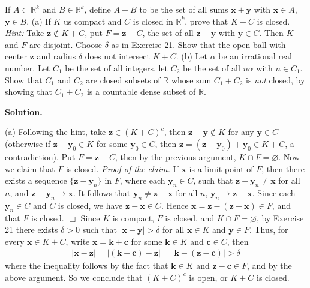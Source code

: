 \documentclass[12pt]{article}
\theoremstyle{definition}
\begin{document}
If $A\subset \mathbb{R}^k$ and $B\in \mathbb{R}^k$, define $A+B$ to be the set of all sums $\mathbf{x}+\mathbf{y}$ with $\mathbf{x}\in A$, $\mathbf{y}\in B$.
(a) If $K$ us compact and $C$ is closed in $\mathbb{R}^k$, prove that $K+C$ is closed.
\textit{Hint:} Take $\mathbf{z}\notin K+C$, put $F=\mathbf{z}-C$, the set of all $\mathbf{z}-\mathbf{y}$ with $\mathbf{y}\in C$. Then $K$ and $F$ are disjoint. Choose $\delta$ as in Exercise 21. Show that the open ball with center $\mathbf{z}$ and radius $\delta$ does not intersect $K+C$.
(b) Let $\alpha$ be an irrational real number. Let $C_1$ be the set of all integers, let $C_2$ be the set of all $n\alpha$ with $n\in C_1$. Show that $C_1$ and $C_2$ are closed subsets of $\mathbb{R}$ whose sum $C_1+C_2$ is \textit{not} closed, by showing that $C_1+C_2$ is a countable dense subset of $\mathbb{R}$.

\smallskip
\noindent\textbf{Solution.}\quad

(a) Following the hint, take $\mathbf{z}\in(K+C)^c$, then $\mathbf{z}-\mathbf{y}\notin K$ for any $\mathbf{y}\in C$ (otherwise if $\mathbf{z}-\mathbf{y}_0\in K$ for some $\mathbf{y}_0\in C$, then $\mathbf{z}=(\mathbf{z}-\mathbf{y}_0)+\mathbf{y}_0\in K+C$, a contradiction). Put $F=\mathbf{z}-C$, then by the previous argument, $K\cap F=\varnothing$. Now we claim that $F$ is closed.
\textit{Proof of the claim.} If $\mathbf{x}$ is a limit point of $F$, then there exists a sequence $\{\mathbf{z}-\mathbf{y}_n\}$ in $F$, where each $\mathbf{y}_n\in C$, such that $\mathbf{z}-\mathbf{y}_n\ne\mathbf{x}$ for all $n$, and $\mathbf{z}-\mathbf{y}_n\to\mathbf{x}$. It follows that $\mathbf{y}_n\ne\mathbf{z}-\mathbf{x}$ for all $n$, $\mathbf{y}_n\to\mathbf{z}-\mathbf{x}$. Since each $\mathbf{y}_n\in C$ and $C$ is closed, we have $\mathbf{z}-\mathbf{x}\in C$. Hence $\mathbf{x}=\mathbf{z}-(\mathbf{z}-\mathbf{x})\in F$, and that $F$ is closed. $\Box$
Since $K$ is compact, $F$ is closed, and $K\cap F=\varnothing$, by Exercise 21 there exists $\delta>0$ such that $\left\vert\mathbf{x}-\mathbf{y}\right\vert>\delta$ for all $\mathbf{x}\in K$ and $\mathbf{y}\in F$. Thus, for every $\mathbf{x}\in K+C$, write $\mathbf{x}=\mathbf{k}+\mathbf{c}$ for some $\mathbf{k}\in K$ and $\mathbf{c}\in C$, then
\begin{align*}
\left\vert\mathbf{x}-\mathbf{z}\right\vert
=\left\vert\left(\mathbf{k}+\mathbf{c}\right)-\mathbf{z}\right\vert
=\left\vert\mathbf{k}-\left(\mathbf{z}-\mathbf{c}\right)\right\vert
>\delta
\end{align*}
where the inequality follows by the fact that $\mathbf{k}\in K$ and $\mathbf{z}-\mathbf{c}\in F$, and by the above argument. So we conclude that $(K+C)^c$ is open, or $K+C$ is closed.
\end{document}
